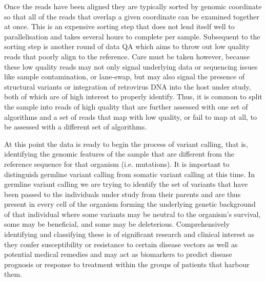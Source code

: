 Once the reads have been aligned they are typically sorted by genomic coordinate so that all of the reads that overlap a given coordinate can be examined together at once. This is an expensive sorting step that does not lend itself well to parallelisation and takes several hours to complete per sample. Subsequent to the sorting step is another round of data QA which aims to throw out low quality reads that poorly align to the reference. Care must be taken however, because these low quality reads may not only signal underlying data or sequencing issues like sample contamination, or lane-swap, but may also signal the presence of structural variants or integration of retrovirus DNA into the host under study, both of which are of high interest to properly identify. Thus, it is common to split the sample into reads of high quality that are further assessed with one set of algorithms and a set of reads that map with low quality, or fail to map at all, to be assessed with a different set of algorithms.

At this point the data is ready to begin the process of variant calling, that is, identifying the genomic features of the sample that are different from the reference sequence for that organism (i.e. mutations). It is important to distinguish germline variant calling from somatic variant calling at this time. In germline variant calling we are trying to identify the set of variants that have been passed to the individuals under study from their parents and are thus present in every cell of the organism forming the underlying genetic background of that individual where some variants may be neutral to the organism's survival, some may be beneficial, and some may be deleterious. Comprehensively identifying and classifying these is of significant research and clinical interest as they confer susceptibility or resistance to certain disease vectors as well as potential medical remedies and may act as biomarkers to predict disease prognosis or response to treatment within the groups of patients that harbour them.

